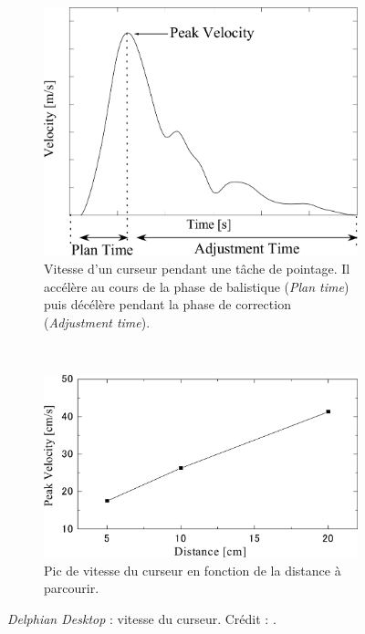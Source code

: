 	\begin{figure}[!htb]
		\begin{subfigure}[t]{0.44\textwidth}
			\centering
			\includegraphics[width=\textwidth]{figures/ch2/delphianPeak}
			\caption{Vitesse d'un curseur pendant une tâche de pointage. Il accélère au cours de la phase de balistique (\emph{Plan time}) puis décélère pendant la phase de correction (\emph{Adjustment time}).}
			\label{fig:delphianPeak}
		\end{subfigure}
		~
		\begin{subfigure}[t]{0.54\textwidth}
			\centering
			\includegraphics[width=\textwidth]{figures/ch2/delphianSpeedDist}
			\caption{Pic de vitesse du curseur en fonction de la distance à parcourir.}
			\label{fig:delphianSpeedDist}
		\end{subfigure}
		\caption[\emph{Delphian Desktop} : vitesse du curseur]{\emph{Delphian Desktop} : vitesse du curseur. Crédit : \cite{asano2005predictive}.}
		\label{fig:plop}
	\end{figure}
	
